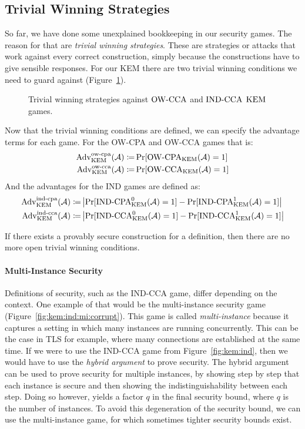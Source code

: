 \subsection{Trivial Winning Strategies}\label{sec:kem:trivial_attacks}
So far, we have done some unexplained bookkeeping in our security games. The reason for that are \emph{trivial winning strategies}.
These are strategies or attacks that work against every correct construction, simply because the constructions have to give sensible responses.
For our KEM there are two trivial winning conditions we need to guard against (Figure~\ref{kem:triv}).

\begin{figure}[!ht]%
    \centering
    
    \caption{Trivial winning strategies against ${\mathrm{OW}\text{-}\mathrm{CCA}}$ and ${\mathrm{IND}\text{-}\mathrm{CCA}}$ $\mathrm{KEM}$ games.}
    \label{kem:triv}
\end{figure}

Now that the trivial winning conditions are defined, we can specify the advantage terms for each game.
For the OW-CPA and OW-CCA games that is:
\begin{align*}
    \mathrm{Adv}_{\mathrm{KEM}}^{\mathrm{ow}\text{-}\mathrm{cpa}}(\mathcal{A})\coloneqq&\Pr[{\mathrm{OW}\text{-}\mathrm{CPA}}_{\mathrm{KEM}}(\mathcal{A})=1]\\
    \mathrm{Adv}_{\mathrm{KEM}}^{\mathrm{ow}\text{-}\mathrm{cca}}(\mathcal{A})\coloneqq&\Pr[{\mathrm{OW}\text{-}\mathrm{CCA}}_{\mathrm{KEM}}(\mathcal{A})=1]
\end{align*}
And the advantages for the IND games are defined as:
\begin{align*}
    \mathrm{Adv}_{\mathrm{KEM}}^{\mathrm{ind}\text{-}\mathrm{cpa}}(\mathcal{A})\coloneqq&\left|\Pr[{\mathrm{IND}\text{-}\mathrm{CPA}}_{\mathrm{KEM}}^0(\mathcal{A})=1]-\Pr[{\mathrm{IND}\text{-}\mathrm{CPA}}_{\mathrm{KEM}}^1(\mathcal{A})=1]\right|\\
    \mathrm{Adv}_{\mathrm{KEM}}^{\mathrm{ind}\text{-}\mathrm{cca}}(\mathcal{A})\coloneqq&\left|\Pr[{\mathrm{IND}\text{-}\mathrm{CCA}}_{\mathrm{KEM}}^0(\mathcal{A})=1]-\Pr[{\mathrm{IND}\text{-}\mathrm{CCA}}_{\mathrm{KEM}}^1(\mathcal{A})=1]\right|
\end{align*}

If there exists a provably secure construction for a definition, then there are no more open trivial winning conditions.

\paragraph{Multi-Instance Security}
Definitions of security, such as the IND-CCA game, differ depending on the context.
One example of that would be the multi-instance security game (Figure~\ref{fig:kem:ind:mi:corrupt}).
This game is called \emph{multi-instance} because it captures a setting in which many instances are running concurrently.
This can be the case in TLS for example, where many connections are established at the same time.
If we were to use the IND-CCA game from Figure~\ref{fig:kem:ind}, then we would have to use the \emph{hybrid argument} to prove security.
The hybrid argument can be used to prove security for multiple instances, by showing step by step that each instance is secure and then showing the indistinguishability between each step.
Doing so however, yields a factor $q$ in the final security bound, where $q$ is the number of instances.
To avoid this degeneration of the security bound, we can use the multi-instance game, for which sometimes tighter security bounds exist.

